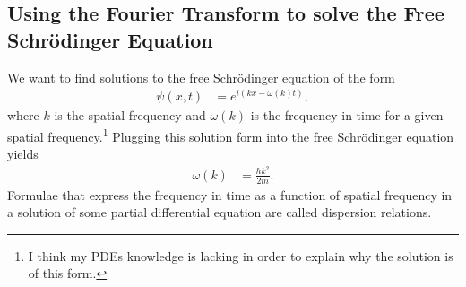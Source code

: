 \documentclass[10pt]{extarticle}
\theoremstyle{plain}
\theoremstyle{definition}
\theoremstyle{remark}
\renewcommand{\newline}{\hfill\break}
\begin{document}
  \subsection{Using the Fourier Transform to solve the Free Schrödinger Equation}%
  We want to find solutions to the free Schrödinger equation of the form
  \begin{align*}
    \psi(x,t) &= e^{i(kx - \omega(k)t)},
  \end{align*}
  where $k$ is the spatial frequency and $\omega(k)$ is the frequency in time for a given spatial frequency.\footnote{I think my PDEs knowledge is lacking in order to explain why the solution is of this form.} Plugging this solution form into the free Schrödinger equation yields
  \begin{align*}
    \omega(k) &= \frac{\hbar k^2}{2m}.
  \end{align*}
  Formulae that express the frequency in time as a function of spatial frequency in a solution of some partial differential equation are called dispersion relations.\newline
\end{document}
